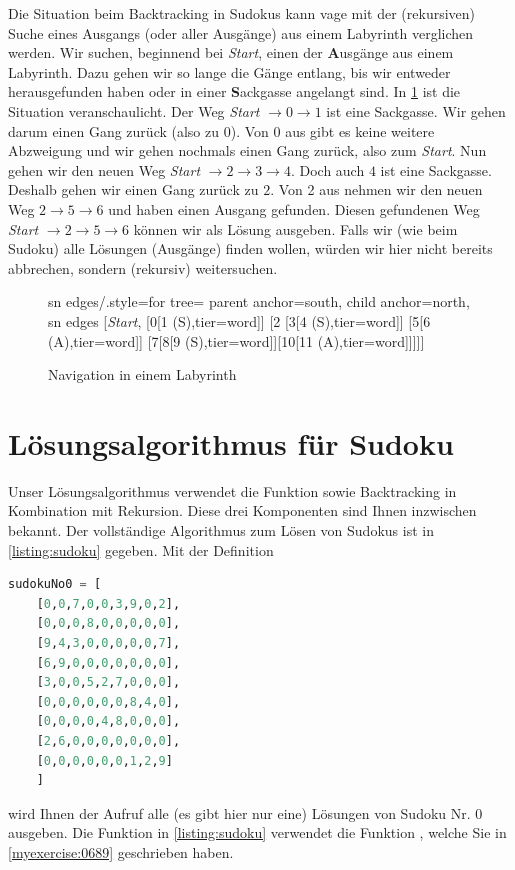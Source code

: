 \clearpage
\begin{myremark}\label{myremark:Metapher2}
	Die Situation beim Backtracking in Sudokus kann vage mit der (rekursiven) Suche eines Ausgangs (oder aller Ausgänge) aus einem Labyrinth verglichen werden. Wir suchen, beginnend bei \textit{Start}, einen der \textbf{A}usgänge aus einem Labyrinth. Dazu gehen wir so lange die Gänge entlang, bis wir entweder herausgefunden haben oder in einer \textbf{S}ackgasse angelangt sind. In \cref{fig:Labyrinth} ist die Situation veranschaulicht. Der Weg \textit{Start} $\to 0 \to 1$ ist eine Sackgasse. Wir gehen darum einen Gang zurück (also zu 0). Von $0$ aus gibt es keine weitere Abzweigung und wir gehen nochmals einen Gang zurück, also zum \textit{Start}. Nun gehen wir den neuen Weg \textit{Start} $\to 2\to 3 \to 4$. Doch auch $4$ ist eine Sackgasse. Deshalb gehen wir einen Gang zurück zu $2$. Von 2 aus nehmen wir den neuen Weg $2\to 5\to 6$ und haben einen Ausgang gefunden. Diesen gefundenen Weg \textit{Start} $\to 2\to 5\to 6$ können wir als Lösung ausgeben. Falls wir (wie beim Sudoku) alle Lösungen (Ausgänge) finden wollen, würden wir hier nicht bereits abbrechen, sondern (rekursiv) weitersuchen.
	\begin{figure}[H]
		\centering
		\begin{forest}
			sn edges/.style={for tree={
					parent anchor=south, child anchor=north}},
			sn edges
				[\textit{Start},
					[0[1 (S),tier=word]]
						[2
								[3[4 (S),tier=word]]
								[5[6 (A),tier=word]]
								[7[8[9 (S),tier=word]][10[11 (A),tier=word]]]]]
		\end{forest}
		\caption{Navigation in einem Labyrinth}
		\label{fig:Labyrinth}
	\end{figure}
\end{myremark}
\clearpage

\section{Lösungsalgorithmus für Sudoku}
Unser Lösungsalgorithmus verwendet die Funktion  sowie Backtracking in Kombination mit Rekursion. Diese drei Komponenten sind Ihnen inzwischen bekannt. Der vollständige Algorithmus zum Lösen von Sudokus ist in \cref{listing:sudoku} gegeben. Mit der Definition
\begin{lstlisting}[language=Python,caption=Abspeichern von Sudoku-Gittern in Python,numbers=none]
  sudokuNo0 = [
    [0,0,7,0,0,3,9,0,2],
    [0,0,0,8,0,0,0,0,0],
    [9,4,3,0,0,0,0,0,7],
    [6,9,0,0,0,0,0,0,0],
    [3,0,0,5,2,7,0,0,0],
    [0,0,0,0,0,0,8,4,0],
    [0,0,0,0,4,8,0,0,0],
    [2,6,0,0,0,0,0,0,0],
    [0,0,0,0,0,0,1,2,9]
    ]
\end{lstlisting}
wird Ihnen der Aufruf  alle (es gibt hier nur eine) Lösungen von Sudoku Nr. 0 ausgeben. Die Funktion in \cref{listing:sudoku} verwendet die Funktion , welche Sie in \cref{myexercise:0689} geschrieben haben.

